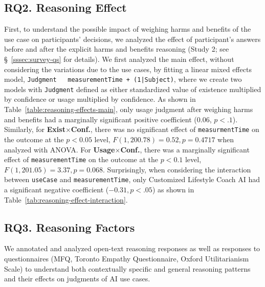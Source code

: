 
% 
% 

\subsection{RQ2. Reasoning Effect}
First, to understand the possible impact of weighing harms and benefits of the use case on participants' decisions, we analyzed the effect of participant's answers before and after the explicit harms and benefits reasoning (Study 2; see \S~\ref{sssec:survey-qs} for details). We first analyzed the main effect, without considering the variations due to the use cases, by fitting a linear mixed effects model, \texttt{Judgment ~ measurementTime + (1|Subject)}, where we create two models with \texttt{Judgment} defined as either standardized value of existence multiplied by confidence or usage multiplied by confidence. As shown in Table~\ref{table:reasoning-effects-main}, only usage judgment after weighing harms and benefits had a marginally significant positive coefficient ($0.06$, $p<.1$). Similarly, for \textbf{Exist$\times$Conf.}, there was no significant effect of \texttt{measurmentTime} on the outcome at the \( p < 0.05 \) level, \( F(1, 200.78) = 0.52, p = 0.4717 \) when analyzed with ANOVA. For \textbf{Usage$\times$Conf.}, there was a marginally significant effect of \texttt{measurementTime} on the outcome at the \( p < 0.1 \) level, \( F(1, 201.05) = 3.37, p = 0.068 \). Surprisingly, when considering the interaction between \texttt{useCase} and \texttt{measurementTime}, only Customized Lifestyle Coach AI had a significant negative coefficient ($-0.31, p<.05$) as shown in Table~\ref{tab:reasoning-effect-interaction}. 


\subsection{RQ3. Reasoning Factors}
We annotated and analyzed open-text reasoning responses as well as responses to questionnaires (MFQ, Toronto Empathy Questionnaire, Oxford Utilitarianism Scale) to understand both contextually specific and general reasoning patterns and their effects on judgments of AI use cases. 

